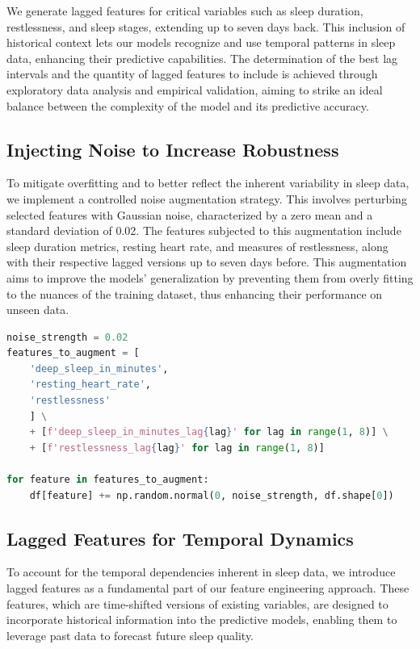 \documentclass[10pt]{extarticle}
\begin{document}
We generate lagged features for critical variables such as sleep duration, restlessness, and sleep stages, extending up to seven days back. This inclusion of historical context lets our models recognize and use temporal patterns in sleep data, enhancing their predictive capabilities. The determination of the best lag intervals and the quantity of lagged features to include is achieved through exploratory data analysis and empirical validation, aiming to strike an ideal balance between the complexity of the model and its predictive accuracy.

\subsection{Injecting Noise to Increase Robustness}

To mitigate overfitting and to better reflect the inherent variability in sleep data, we implement a controlled noise augmentation strategy. This involves perturbing selected features with Gaussian noise, characterized by a zero mean and a standard deviation of 0.02. The features subjected to this augmentation include sleep duration metrics, resting heart rate, and measures of restlessness, along with their respective lagged versions up to seven days before. This augmentation aims to improve the models' generalization by preventing them from overly fitting to the nuances of the training dataset, thus enhancing their performance on unseen data.

\begin{lstlisting}[language=Python]
noise_strength = 0.02
features_to_augment = [
    'deep_sleep_in_minutes',
    'resting_heart_rate',
    'restlessness'
    ] \
    + [f'deep_sleep_in_minutes_lag{lag}' for lag in range(1, 8)] \
    + [f'restlessness_lag{lag}' for lag in range(1, 8)]

for feature in features_to_augment:
    df[feature] += np.random.normal(0, noise_strength, df.shape[0])
\end{lstlisting}

\subsection{Lagged Features for Temporal Dynamics}

To account for the temporal dependencies inherent in sleep data, we introduce lagged features as a fundamental part of our feature engineering approach. These features, which are time-shifted versions of existing variables, are designed to incorporate historical information into the predictive models, enabling them to leverage past data to forecast future sleep quality.
\end{document}

